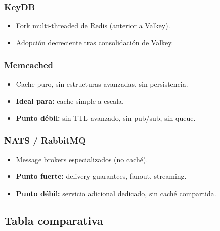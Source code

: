 \documentclass[11pt,a4paper]{article}
\begin{document}
\subsubsection{KeyDB}
\begin{itemize}[leftmargin=*,itemsep=0pt]
\item Fork multi-threaded de Redis (anterior a Valkey).
\item Adopción decreciente tras consolidación de Valkey.
\end{itemize}

\subsubsection{Memcached}
\begin{itemize}[leftmargin=*,itemsep=0pt]
\item Cache puro, sin estructuras avanzadas, sin persistencia.
\item \textbf{Ideal para:} cache simple a escala.
\item \textbf{Punto débil:} sin TTL avanzado, sin pub/sub, sin queue.
\end{itemize}

\subsubsection{NATS / RabbitMQ}
\begin{itemize}[leftmargin=*,itemsep=0pt]
\item Message brokers especializados (no caché).
\item \textbf{Punto fuerte:} delivery guarantees, fanout, streaming.
\item \textbf{Punto débil:} servicio adicional dedicado, sin caché compartida.
\end{itemize}

\subsection{Tabla comparativa}
\end{document}
